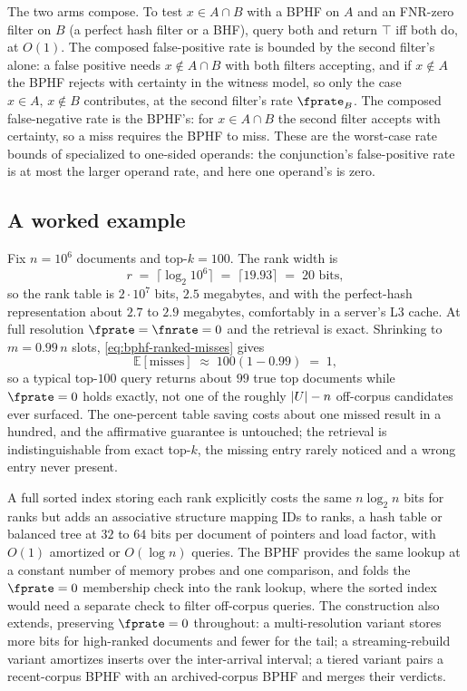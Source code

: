 \begin{remark}
\label{rem:bphf-bhf-compose}
The two arms compose. To test $x \in A \cap B$ with a BPHF on $A$ and an
FNR-zero filter on $B$ (a perfect hash filter or a BHF), query both and
return $\top$ iff both do, at $O(1)$. The composed false-positive rate is
bounded by the second filter's alone: a false positive needs $x \notin A
\cap B$ with both filters accepting, and if $x \notin A$ the BPHF rejects
with certainty in the witness model, so only the case $x \in A,\, x
\notin B$ contributes, at the second filter's rate $\fprate_B$. The
composed false-negative rate is the BPHF's: for $x \in A \cap B$ the
second filter accepts with certainty, so a miss requires the BPHF to
miss. These are the worst-case rate bounds of
 specialized to one-sided operands: the
conjunction's false-positive rate is at most the larger operand rate,
and here one operand's is zero.
\end{remark}

\subsection*{A worked example}

Fix $n = 10^6$ documents and top-$k = 100$. The rank width is
\[
  r \;=\; \lceil \log_2 10^6 \rceil \;=\; \lceil 19.93 \rceil \;=\; 20
  \text{ bits},
\]
so the rank table is $2 \cdot 10^7$ bits, $2.5$ megabytes, and with the
perfect-hash representation about $2.7$ to $2.9$ megabytes, comfortably in
a server's L3 cache. At full resolution $\fprate = \fnrate = 0$ and the
retrieval is exact. Shrinking to $m = 0.99\,n$ slots, \eqref{eq:bphf-ranked-misses}
gives
\[
  \mathbb{E}[\text{misses}]
  \;\approx\; 100 \left( 1 - 0.99 \right)
  \;=\; 1,
\]
so a typical top-$100$ query returns about $99$ true top documents while
$\fprate = 0$ holds exactly, not one of the roughly $|U| - n$
off-corpus candidates ever surfaced. The one-percent table saving costs
about one missed result in a hundred, and the affirmative guarantee is
untouched; the retrieval is indistinguishable from exact top-$k$, the
missing entry rarely noticed and a wrong entry never present.

A full sorted index storing each rank explicitly costs the same
$n \log_2 n$ bits for ranks but adds an associative structure mapping IDs
to ranks, a hash table or balanced tree at $32$ to $64$ bits per document
of pointers and load factor, with $O(1)$ amortized or $O(\log n)$
queries. The BPHF provides the same lookup at a constant number of memory probes
and one comparison, and folds the $\fprate = 0$ membership check into the
rank lookup, where the sorted
index would need a separate check to filter off-corpus queries. The
construction also extends, preserving $\fprate = 0$ throughout: a
multi-resolution variant stores more bits for high-ranked documents and
fewer for the tail; a streaming-rebuild variant amortizes inserts over
the inter-arrival interval; a tiered variant pairs a recent-corpus BPHF
with an archived-corpus BPHF and merges their verdicts.

